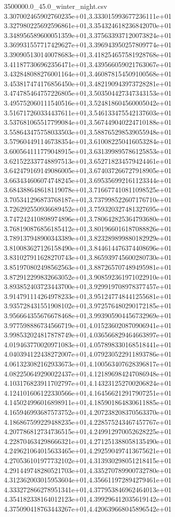 \begin{filecontents*}{3500000.0_45.0_winter_night.csv}
3.307002465902760235e+01,3.333015993677236111e+01
3.327980225692596861e+01,3.354324618236842070e+01
3.348956589600051359e+01,3.375633937120073824e+01
3.369931557717429627e+01,3.396943950257809774e+01
3.390905130140078683e+01,3.418254657581928768e+01
3.411877306962356471e+01,3.439566059021763067e+01
3.432848088276001164e+01,3.460878154509100568e+01
3.453817474176856450e+01,3.482190943973728281e+01
3.474785464757226805e+01,3.503504427347343153e+01
3.495752060111540516e+01,3.524818604560005042e+01
3.516717260334437611e+01,3.546133475542137603e+01
3.537681065517799084e+01,3.567449040224710188e+01
3.558643475758033503e+01,3.588765298539055948e+01
3.579604491146738354e+01,3.610082250416053284e+01
3.600564111779048915e+01,3.631399895786125853e+01
3.621522337748897513e+01,3.652718234579424461e+01
3.642479169149086005e+01,3.674037266727918905e+01
3.663434606074748245e+01,3.695356992161123344e+01
3.684388648618119078e+01,3.716677410811098525e+01
3.705341296873768187e+01,3.737998522607176710e+01
3.726292550936689452e+01,3.759320327481327695e+01
3.747242410898974896e+01,3.780642825364793680e+01
3.768190876856185412e+01,3.801966016187088826e+01
3.789137948900343389e+01,3.823289899880182929e+01
3.810083627126158490e+01,3.844614476374408696e+01
3.831027911628270743e+01,3.865939745600280730e+01
3.851970802498562563e+01,3.887265707489495981e+01
3.872912299832663052e+01,3.908592361971022910e+01
3.893852403723443700e+01,3.929919708978377457e+01
3.914791114264978233e+01,3.951247748441255681e+01
3.935728431551908102e+01,3.972576480290172185e+01
3.956664355676678468e+01,3.993905904456732969e+01
3.977598886734566719e+01,4.015236020870906941e+01
3.998532024817878749e+01,4.036566829464663897e+01
4.019463770020971083e+01,4.057898330168518441e+01
4.040394122438272007e+01,4.079230522911893786e+01
4.061323082162933673e+01,4.100563407628396817e+01
4.082250649290022437e+01,4.121896984247086948e+01
4.103176823911702797e+01,4.143231252700206824e+01
4.124101606122330566e+01,4.164566212917907251e+01
4.145024996016898911e+01,4.185901864830611885e+01
4.165946993687573752e+01,4.207238208370563370e+01
4.186867599229488235e+01,4.228575243467457767e+01
4.207786812734736515e+01,4.249912970052628225e+01
4.228704634298666321e+01,4.271251388058135490e+01
4.249621064015633465e+01,4.292590497413675621e+01
4.270536101977732102e+01,4.313930298051218415e+01
4.291449748280521703e+01,4.335270789900732780e+01
4.312362003015953604e+01,4.356611972894279461e+01
4.333272866278951341e+01,4.377953846962464013e+01
4.354182338164012123e+01,4.399296412035619142e+01
4.375090418763443267e+01,4.420639668045896542e+01

\end{filecontents*}
